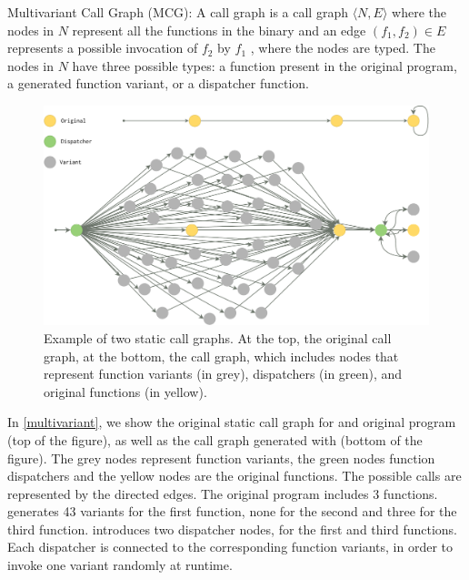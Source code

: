 \begin{definition}{Multivariant Call Graph (MCG):}\label{def:EP}
    A call graph is a call graph $\langle N,E \rangle$ where the nodes in $N$ represent all the functions in the binary and an edge $(f_1,f_2) \in E$ represents a possible invocation of $f_2$ by $f_1$  \cite{ryder1979}, where the nodes are typed. The nodes in $N$ have three possible types: a function present in the original program,  a generated function variant, or a dispatcher function.
\end{definition}


\begin{figure}
    \centering
  \includegraphics[width=.8\linewidth]{diagrams/CFG.pdf}
  \caption{Example of two static call graphs. At the top, the original call graph, at the bottom, the call graph, which includes nodes that represent function variants (in grey), dispatchers (in green), and original functions  (in yellow).
}
  \label{multivariant}
\end{figure}

In \autoref{multivariant}, we show the original static call graph for and original program (top of the figure), as well as the call graph generated with \tool (bottom of the figure).
The grey nodes represent function variants, the green nodes function dispatchers and the yellow nodes are the original functions.
The possible calls are represented by the directed edges.
The original program includes 3 functions. \tool generates 43 variants for the first function, none for the second and three for the third function. 
\tool introduces two dispatcher nodes, for the first and third functions. Each dispatcher is connected to the corresponding function variants, in order to invoke one variant randomly at runtime.



